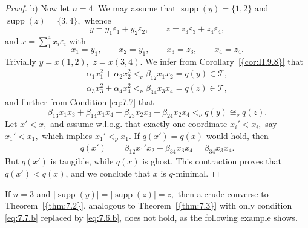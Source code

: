 \documentclass [12pt,a4paper,reqno]{amsart}
\begin{document}
\begin{proof}
b) Now let $n=4.$ We may assume that ${\operatorname{supp}} (y)=\{1,2\}$  and ${\operatorname{supp}}
(z)=\{3,4\},$ whence
$$y=y_1{\varepsilon}_1+y_2{\varepsilon}_2,\qquad
z=z_3{\varepsilon}_3+z_4{\varepsilon}_4,$$ and
$x=\sum\limits_1^4x_i{\varepsilon}_i$ with
$$x_1=y_1,\qquad x_2=y_1,\qquad x_3=z_3,\qquad x_4=z_4.$$
Trivially $y=x(1,2),$ $z=x(3,4).$ We infer from {Corollary~\ref{{cor:II.9.8}}} 
that \begin{gather}
{\alpha}_1x_1^2+{\alpha}_2x_2^2<_\nu{\beta}_{12}x_1x_2=q(y)\in {\mathcal T},\\
{\alpha}_3x_3^2+{\alpha}_4x_4^2<_\nu{\beta}_{34}x_3x_4=q(z)\in {\mathcal T},
\end{gather}
and further from Condition \eqref{eq:7.7} that
$${\beta}_{13}x_1x_3+{\beta}_{14}x_1x_4+{\beta}_{23}x_2x_3+{\beta}_{24}x_2x_4<_\nu
q(y)\cong_\nu q(z).$$ Let $x'<x,$ and assume w.l.o.g. that exactly
one coordinate $x_i'<x_i,$ say $x_1'<x_1,$ which implies
$x_1'<_\nu x_1.$ If $q(x')=q(x)$ would hold, then
\begin{align*}
q(x')&={\beta}_{12}x_1'x_2+{\beta}_{34}x_3x_4 = {\beta}_{34}x_3x_4.
\end{align*}
But $q(x')$ is tangible, while $q(x)$ is ghost. This contraction
proves that $q(x')<q(x)$, and we conclude that $x$ is $q$-minimal.
\end{proof}

If $n=3$ and $|{\operatorname{supp}} (y)|=|{\operatorname{supp}} (z)|=z,$ then a crude converse to
{Theorem~\ref{{thm:7.2}}}, analogous to {Theorem~\ref{{thm:7.3}}} with only
condition \eqref{eq:7.7.b} replaced by \eqref{eq:7.6.b}, does not
hold, as the following example shows.
\end{document}
